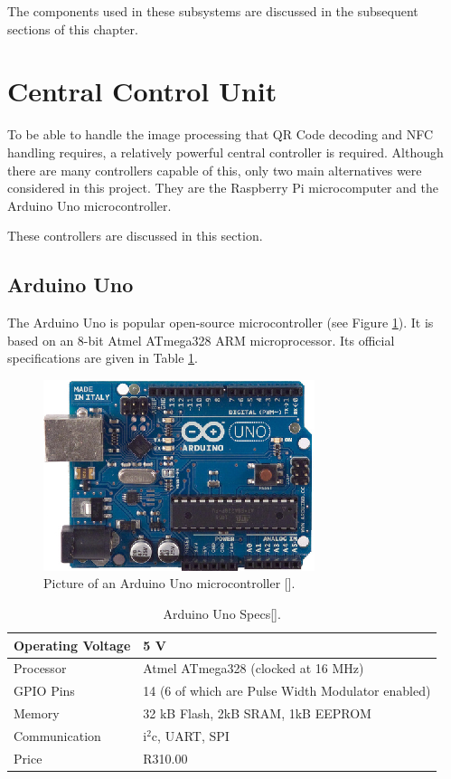 The components used in these subsystems are discussed in the subsequent sections of this
chapter.

\section{Central Control Unit}

To be able to handle the image processing that QR Code decoding and NFC handling requires, a
relatively powerful central controller is required. Although there are many controllers capable
of this, only two main alternatives were considered in this project. They are the
Raspberry Pi microcomputer and the Arduino Uno microcontroller.

These controllers are discussed in this section.

\subsection{Arduino Uno}

The Arduino Uno is popular open-source microcontroller (see Figure
\ref{fig:arduino}). It is based on an 8-bit Atmel ATmega328 ARM microprocessor.
Its official specifications are given in Table \ref{tab:arduino-specs}.

\begin{figure}
\centering
\includegraphics[scale=1.5]{arduino.eps}
\caption[Picture of an Arduino Uno microcontroller.]{Picture of an Arduino Uno
microcontroller [\cite{manual:arduino-specs}].}
\label{fig:arduino}
\end{figure}

\begin{table}
\centering
\caption{Arduino Uno Specs[\cite{manual:arduino-specs}].}
  \begin{tabular}{|l|l|}
  \hline
    Operating Voltage & 5 V \\\hline
    Processor & Atmel ATmega328 (clocked at 16 MHz) \\\hline
    GPIO Pins & 14 (6 of which are Pulse Width Modulator enabled) \\\hline
    Memory & 32 kB Flash, 2kB SRAM, 1kB EEPROM \\\hline
    Communication & i$^2$c, UART, SPI \\\hline
    Price & R310.00 \\\hline
  \end{tabular}
  \label{tab:arduino-specs}
\end{table}

